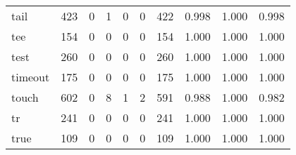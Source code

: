 \begin{longtable}{lp{2.0cm}p{2.0cm}p{2.0cm}p{2.0cm}p{2.0cm}p{2.0cm}p{2.0cm}p{2.0cm}p{2.0cm}}
tail      &                    423 &                                  0 &                                 1 &                                0 &                                 0 &                             422 &                                   0.998 &                                  1.000 &                                0.998 \\
tee       &                    154 &                                  0 &                                 0 &                                0 &                                 0 &                             154 &                                   1.000 &                                  1.000 &                                1.000 \\
test      &                    260 &                                  0 &                                 0 &                                0 &                                 0 &                             260 &                                   1.000 &                                  1.000 &                                1.000 \\
timeout   &                    175 &                                  0 &                                 0 &                                0 &                                 0 &                             175 &                                   1.000 &                                  1.000 &                                1.000 \\
touch     &                    602 &                                  0 &                                 8 &                                1 &                                 2 &                             591 &                                   0.988 &                                  1.000 &                                0.982 \\
tr        &                    241 &                                  0 &                                 0 &                                0 &                                 0 &                             241 &                                   1.000 &                                  1.000 &                                1.000 \\
true      &                    109 &                                  0 &                                 0 &                                0 &                                 0 &                             109 &                                   1.000 &                                  1.000 &                                1.000 \\

\end{longtable}
